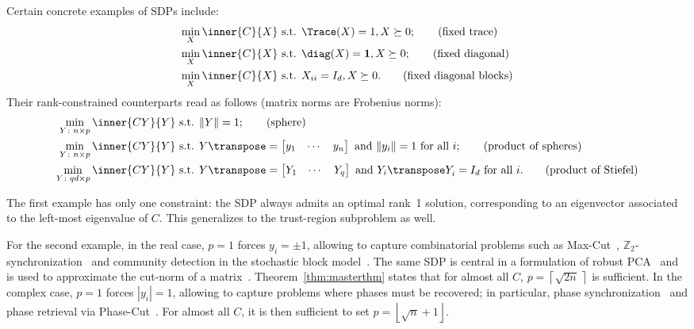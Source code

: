 \documentclass{article}
\newcommand{\1}{\mathbf{1}}
\begin{document}
Certain concrete examples of SDPs include:
\begin{align}
	\min_X \inner{C}{X} & \textrm{ s.t. } \Trace(X) = 1, X\succeq 0; \tag{fixed trace} \\
	\min_X \inner{C}{X} & \textrm{ s.t. } \diag(X) = \mathbf{1}, X\succeq 0; \tag{fixed diagonal} \\
	\min_X \inner{C}{X} & \textrm{ s.t. } X_{ii} = I_d, X\succeq 0. \tag{fixed diagonal blocks}
\end{align}
Their rank-constrained counterparts read as follows (matrix norms are Frobenius norms):
\begin{align}
\min_{Y\colon n\times p} \inner{CY}{Y} & \textrm{ s.t. } \|Y\| = 1; \tag{sphere} \\
\min_{Y\colon n\times p} \inner{CY}{Y} & \textrm{ s.t. } Y\transpose = \begin{bmatrix} y_1 & \cdots & y_n \end{bmatrix} \textrm{ and } \|y_i\| = 1 \textrm{ for all } i; \tag{product of spheres} \\
\min_{Y\colon qd\times p} \inner{CY}{Y} & \textrm{ s.t. } Y\transpose = \begin{bmatrix} Y_1 & \cdots & Y_{q} \end{bmatrix} \textrm{ and } Y_i\transpose Y_i^{} = I_d \textrm{ for all } i. \tag{product of Stiefel}
\end{align}

The first example has only one constraint: the SDP always admits an optimal rank~1 solution, corresponding to an eigenvector associated to the left-most eigenvalue of $C$. This generalizes to the trust-region subproblem as well.

For the second example, in the real case, $p=1$ forces $y_i = \pm 1$, allowing to capture combinatorial problems such as Max-Cut~\citep{goemans1995maxcut}, $\mathbb{Z}_2$-synchronization~\citep{javanmard2015phase} and community detection in the stochastic block model~\citep{abbe2014exact,bandeira2016lowrankmaxcut}. The same SDP is central in a formulation of robust PCA~\citep{mccoy2011robustpca} and is used to approximate the cut-norm of a matrix~\citep{alon2006cutnorm}. Theorem~\ref{thm:masterthm} states that for almost all $C$, $p =  \left\lceil \sqrt{2n}\, \right\rceil$ is sufficient.
In the complex case, $p=1$ forces $|y_i| = 1$, allowing to capture problems where phases must be recovered; in particular, phase synchronization~\citep{bandeira2014tightness,singer2010angular} and phase retrieval via Phase-Cut~\citep{waldspurger2012phase}. For almost all $C$, it is then sufficient to set $p = \left\lfloor \sqrt{n}+1 \right\rfloor$.
\end{document}
